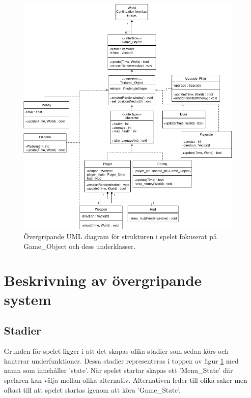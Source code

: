 \documentclass{TDP005mall}
\begin{document}
\begin{figure}[H]
         \begin{center}
             \includegraphics[width=15cm]{Graphic/overview_part2.png}
             \caption{\label{fig:1} Övergripande UML diagram för strukturen i spelet fokuserat på Game\_Object och dess underklasser.}
         \end{center}
\end{figure}
\pagebreak
\section{Beskrivning av övergripande system}

\subsection{Stadier}
Grunden för spelet ligger i att det skapas olika stadier som sedan körs och hanterar underfunktioner. Dessa stadier representeras i toppen av figur \ref{fig:1} med namn som innehåller 'state'. När spelet startar skapas ett 'Menu\_State' där spelaren kan välja mellan olika alternativ. Alternativen leder till olika saker men oftast till att spelet startas igenom att köra 'Game\_State'. 
\end{document}

